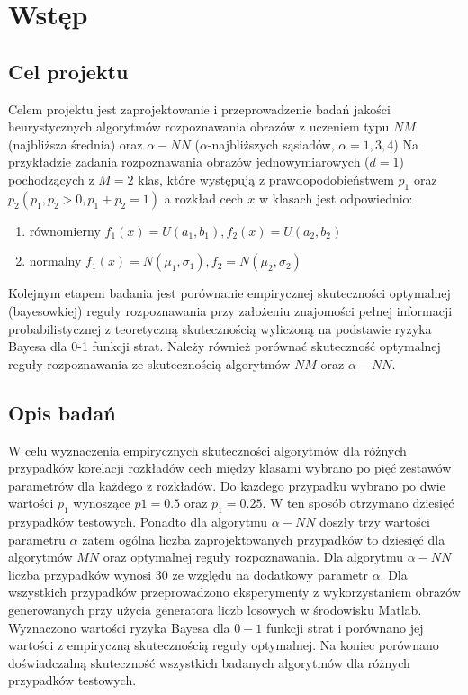 \section{Wstęp}
	\subsection{Cel projektu}

	Celem projektu jest zaprojektowanie i przeprowadzenie badań jakości heurystycznych algorytmów rozpoznawania obrazów z uczeniem typu $NM$  (najbliższa średnia) oraz $\alpha-NN$ ($\alpha$-najbliższych sąsiadów, $ \alpha=1,3,4$) Na przykładzie zadania rozpoznawania obrazów jednowymiarowych ($d=1$) pochodzących z $M = 2$ klas, które występują z prawdopodobieństwem $p_1$ oraz $p_2 (p_1,p_2>0, p_1+p_2=1)$ a rozkład cech $x$ w klasach jest odpowiednio:
	\begin{enumerate}
	\item równomierny $f_1(x)=U(a_1,b_1), f_2(x)=U(a_2,b_2)$
	\item normalny $f_1(x)=N(\mu_1, \sigma_1), f_2=N(\mu_2, \sigma_2)$
	\end{enumerate}
	Kolejnym etapem badania jest porównanie empirycznej skuteczności optymalnej (bayesowkiej) reguły rozpoznawania przy założeniu znajomości pełnej informacji probabilistycznej z teoretyczną skutecznością wyliczoną na podstawie ryzyka Bayesa dla 0-1 funkcji strat. Należy również porównać skuteczność optymalnej reguły rozpoznawania ze skutecznością algorytmów $NM$ oraz $\alpha-NN$.
	
	\subsection{Opis badań}
	
	W celu wyznaczenia empirycznych skuteczności algorytmów dla różnych przypadków korelacji rozkładów cech między klasami wybrano po pięć zestawów parametrów dla każdego z rozkładów. Do każdego przypadku wybrano po dwie wartości $p_1$ wynoszące $p1=0.5$ oraz $p_1=0.25$. W ten sposób otrzymano dziesięć przypadków testowych. Ponadto dla algorytmu $\alpha-NN$ doszły trzy wartości parametru $\alpha$ zatem ogólna liczba zaprojektowanych przypadków to dziesięć dla algorytmów $MN$ oraz optymalnej reguły rozpoznawania. Dla algorytmu $\alpha-NN$ liczba przypadków wynosi 30 ze względu na dodatkowy parametr $\alpha$. \newline
	Dla wszystkich przypadków przeprowadzono eksperymenty z wykorzystaniem obrazów generowanych przy użycia generatora liczb losowych w środowisku  Matlab.
	Wyznaczono wartości ryzyka Bayesa dla $0-1$ funkcji strat i porównano jej wartości z empiryczną skutecznością reguły optymalnej. \newline
	Na koniec porównano doświadczalną skuteczność wszystkich badanych algorytmów dla różnych przypadków testowych.
	
